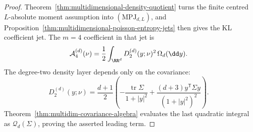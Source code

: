 \begin{proof}
Theorem~\ref{thm:multidimensional-density-quotient} turns the finite centred
\(L\)-absolute moment assumption into \((\mathrm{MPJ}_{d,L})\), and
Proposition~\ref{thm:multidimensional-poisson-entropy-jets} then gives the KL
coefficient jet.  The \(m=4\) coefficient in that jet is
\[
\mathcal A_4^{(d)}(\nu)
=\frac12\int_{\RR^d}D_2^{(d)}(y;\nu)^2\,\Omega_d(\dd y).
\]
The degree-two density layer depends only on the covariance:
\[
D_2^{(d)}(y;\nu)=
\frac{d+1}{2}\left(
-\frac{\operatorname{tr}\Sigma}{1+|y|^2}
+\frac{(d+3)y^{\mathsf T}\Sigma y}{(1+|y|^2)^2}
\right).
\]
Theorem~\ref{thm:multidim-covariance-algebra} evaluates the last
quadratic integral as \(\mathcal Q_d(\Sigma)\), proving the asserted leading
term.
\end{proof}
